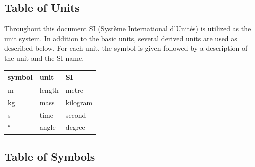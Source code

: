 \documentclass[12pt, titlepage]{article}
\begin{document}
\subsection{Table of Units}

Throughout this document SI (Syst\`{e}me International d'Unit\'{e}s) is
utilized as the unit system. In addition to the basic units, several derived
units are used as described below.  
For each unit, the symbol is given followed by a
description of the unit and the SI name.

\renewcommand{\arraystretch}{1.2}
\begin{center}
  \noindent \begin{tabular}{l l l} 
    \toprule		
    \textbf{symbol} & \textbf{unit} & \textbf{SI}\\
    \midrule 
    \si{\metre} & length & metre\\
    \si{\kilogram} & mass & kilogram\\
    \si{\second} & time & second\\
    \si{\degree} & angle & degree\\
    \bottomrule
  \end{tabular}
\end{center}

\subsection{Table of Symbols}
\end{document}
